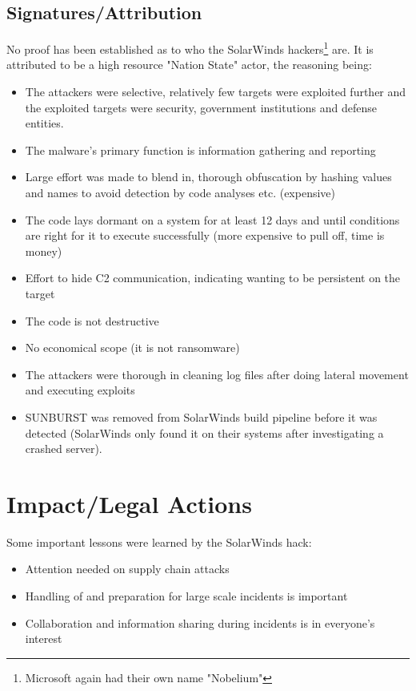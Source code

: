 \documentclass[
	letterpaper, %
	10pt, %
	unnumberedsections, %
	twoside, %
]{LTJournalArticle}
\begin{document}
\subsection{Signatures/Attribution}
No proof has been established as to who the SolarWinds hackers\footnote{Microsoft again had their own name "Nobelium"} are.
It is attributed to be a high resource "Nation State" actor, the reasoning being:
\begin{itemize}
	\item The attackers were selective, relatively few targets were exploited further and the exploited targets were security, government institutions and defense entities.
	\item The malware's primary function is information gathering and reporting
	\item Large effort was made to blend in, thorough obfuscation by hashing values and names to avoid detection by code analyses etc. (expensive)   
	\item The code lays dormant on a system for at least 12 days and until conditions are right for it to execute successfully (more expensive to pull off, time is money)
	\item Effort to hide C2 communication, indicating wanting to be persistent on the target
	\item The code is not destructive
	\item No economical scope (it is not ransomware)
	\item The attackers were thorough in cleaning log files after doing lateral movement and executing exploits 
	\item SUNBURST was removed from SolarWinds build pipeline before it was detected (SolarWinds only found it on their systems after investigating a crashed server\cite{SolarWindsCISO}).
	
\end{itemize} 


\section{Impact/Legal Actions} 
Some important lessons were learned by the SolarWinds hack:
\begin{itemize}
	\item Attention needed on supply chain attacks
	\item Handling of and preparation for large scale incidents is important
	\item Collaboration and information sharing during incidents is in everyone's interest
\end{itemize} 
\end{document}
